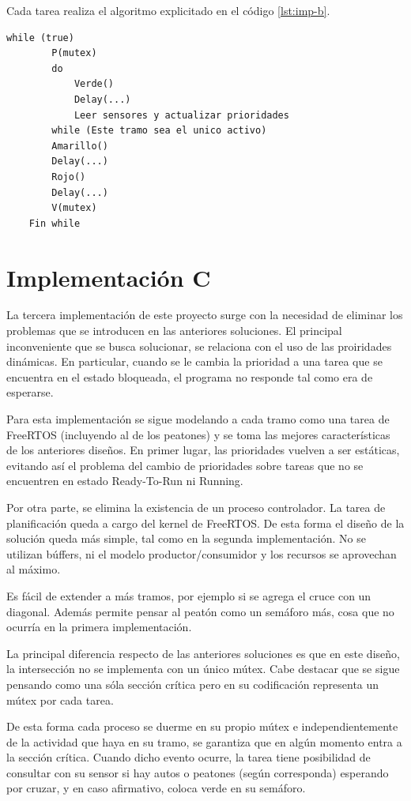 Cada tarea realiza el algoritmo explicitado en el código \ref{lst:imp-b}.

\begin{lstlisting}[label=lst:imp-b, caption=Pseudocódigo del programa que corre cada tarea en la implementación B.]
	while (true)
		P(mutex)
		do
			Verde()
			Delay(...)
			Leer sensores y actualizar prioridades
		while (Este tramo sea el unico activo)
		Amarillo()
		Delay(...)
		Rojo()
		Delay(...)
		V(mutex)
	Fin while
\end{lstlisting}

\section{Implementación C}

La tercera implementación de este proyecto surge con la necesidad de eliminar los problemas que se introducen en las anteriores soluciones.
El principal inconveniente que se busca solucionar, se relaciona con el uso de las proiridades dinámicas.
En particular, cuando se le cambia la prioridad a una tarea que se encuentra en el estado bloqueada, el programa no responde tal como era de esperarse.

Para esta implementación se sigue modelando a cada tramo como una tarea de FreeRTOS (incluyendo al de los peatones) y se toma las mejores características de los anteriores diseños.
En primer lugar, las prioridades vuelven a ser estáticas, evitando así el problema del cambio de prioridades sobre tareas que no se encuentren en estado Ready-To-Run ni Running.

Por otra parte, se elimina la existencia de un proceso controlador.
La tarea de planificación queda a cargo del kernel de FreeRTOS.
De esta forma el diseño de la solución queda más simple, tal como en la segunda implementación.
No se utilizan búffers, ni el modelo productor/consumidor y los recursos se aprovechan al máximo.

Es fácil de extender a más tramos, por ejemplo si se agrega el cruce con un diagonal.
Además permite pensar al peatón como un semáforo más, cosa que no ocurría en la primera implementación.

La principal diferencia respecto de las anteriores soluciones es que en este diseño, la intersección no se implementa con un único mútex.
Cabe destacar que se sigue pensando como una sóla sección crítica pero en su codificación representa un mútex por cada tarea.

De esta forma cada proceso se duerme en su propio mútex e independientemente de la actividad que haya en su tramo, se garantiza que en algún momento entra a la sección crítica.
Cuando dicho evento ocurre, la tarea tiene posibilidad de consultar con su sensor si hay autos o peatones (según corresponda) esperando por cruzar, y en caso afirmativo, coloca verde en su semáforo.

